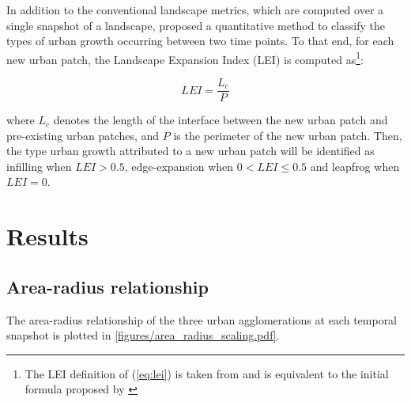 In addition to the conventional landscape metrics, which are computed over a single snapshot of a landscape, \cite{liu2010new} proposed a quantitative method to classify the types of urban growth occurring between two time points. 
To that end, for each new urban patch, the Landscape Expansion Index (LEI) is computed as\footnote{The LEI definition of (\ref{eq:lei}) is taken from \cite{nong2018quantifying} and is equivalent to the initial formula proposed by \cite{liu2010new}}:

\begin{equation}
  \label{eq:lei}
  LEI = \frac{L_c}{P}
\end{equation}

where $L_c$ denotes the length of the interface between the new urban patch and pre-existing urban patches, and $P$ is the perimeter of the new urban patch. Then, the type urban growth attributed to a new urban patch will be identified as infilling when $LEI > 0.5$, edge-expansion when $0 < LEI \leq 0.5$ and leapfrog when $LEI = 0$.



\section*{Results}

\subsection*{Area-radius relationship}

The area-radius relationship of the three urban agglomerations at each temporal snapshot is plotted in \autoref{figures/area_radius_scaling.pdf}.

